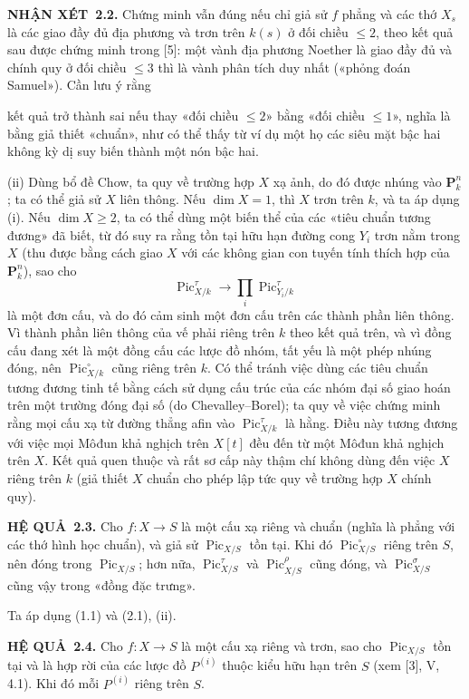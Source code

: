 \documentclass[11pt,twoside,openany]{book}
\numberwithin{equation}{section}
\newcommand{\src}[1]{%
  \phantomsection\hypertarget{src:\fgasourceid:#1}{}%
  \marginpar{\raggedleft\footnotesize\sffamily #1}%
}
\newcommand{\fgasourceid}{unset}
\newcommand{\result}[2]{\par\medskip\noindent\textbf{#1\if\relax\detokenize{#2}\relax\else\ #2\fi.}\quad}
\begin{document}
\result{NHẬN XÉT}{2.2} Chứng minh vẫn đúng nếu chỉ giả sử $f$ phẳng và các thớ
$X_s$ là các giao đầy đủ địa phương và trơn trên $k(s)$ ở đối chiều $\leq2$,
theo kết quả sau được chứng minh trong [5]: một vành địa phương Noether là giao
đầy đủ và chính quy ở đối chiều $\leq3$ thì là vành phân tích duy nhất («phỏng
đoán Samuel»). Cần lưu ý rằng
\src{232}
kết quả trở thành sai nếu thay «đối chiều $\leq2$» bằng «đối chiều
$\leq1$», nghĩa là bằng giả thiết «chuẩn», như có thể thấy từ ví dụ một họ các
siêu mặt bậc hai không kỳ dị suy biến thành một nón bậc hai.

(ii) Dùng bổ đề Chow, ta quy về trường hợp $X$ xạ ảnh, do đó được nhúng vào
$\mathbf P_k^n$; ta có thể giả sử $X$ liên thông. Nếu $\dim X=1$, thì $X$ trơn
trên $k$, và ta áp dụng (i). Nếu $\dim X\geq2$, ta có thể dùng một biến thể của
các «tiêu chuẩn tương đương» đã biết, từ đó suy ra rằng tồn tại hữu hạn đường
cong $Y_i$ trơn nằm trong $X$ (thu được bằng cách giao $X$ với các không gian
con tuyến tính thích hợp của $\mathbf P_k^n$), sao cho
\[
\operatorname{Pic}_{X/k}^\tau\longrightarrow
\prod_i\operatorname{Pic}_{Y_i/k}^\tau
\]
là một đơn cấu, và do đó cảm sinh một đơn cấu trên các thành phần liên thông.
Vì thành phần liên thông của vế phải riêng trên $k$ theo kết quả trên, và vì
đồng cấu đang xét là một đồng cấu các lược đồ nhóm, tất yếu là một phép nhúng
đóng, nên $\operatorname{Pic}_{X/k}^\circ$ cũng riêng trên $k$. Có thể tránh
việc dùng các tiêu chuẩn tương đương tinh tế bằng cách sử dụng cấu trúc của các
nhóm đại số giao hoán trên một trường đóng đại số (do Chevalley--Borel); ta quy
về việc chứng minh rằng mọi cấu xạ từ đường thẳng afin vào
$\operatorname{Pic}_{X/k}^\tau$ là hằng. Điều này tương đương với việc mọi
Môđun khả nghịch trên $X[t]$ đều đến từ một Môđun khả
nghịch trên $X$. Kết quả quen thuộc và rất sơ cấp này thậm chí không dùng đến
việc $X$ riêng trên $k$ (giả thiết $X$ chuẩn cho phép lập tức quy về trường hợp
$X$ chính quy).

\result{HỆ QUẢ}{2.3} Cho $f:X\longrightarrow S$ là một cấu xạ riêng và chuẩn
(nghĩa là phẳng với các thớ hình học chuẩn), và giả sử
$\operatorname{Pic}_{X/S}$ tồn tại. Khi đó $\operatorname{Pic}_{X/S}^\circ$
riêng trên $S$, nên đóng trong $\operatorname{Pic}_{X/S}$; hơn nữa,
$\operatorname{Pic}_{X/S}^\tau$ và $\operatorname{Pic}_{X/S}^\rho$ cũng đóng,
và $\operatorname{Pic}_{X/S}^\sigma$ cũng vậy trong «đồng đặc trưng».

Ta áp dụng (1.1) và (2.1), (ii).

\result{HỆ QUẢ}{2.4} Cho $f:X\longrightarrow S$ là một cấu xạ riêng và trơn,
sao cho $\operatorname{Pic}_{X/S}$ tồn tại và là hợp rời của các lược đồ
$P^{(i)}$ thuộc kiểu hữu hạn trên $S$ (xem [3], V, 4.1). Khi đó mỗi $P^{(i)}$
riêng trên $S$.
\end{document}
